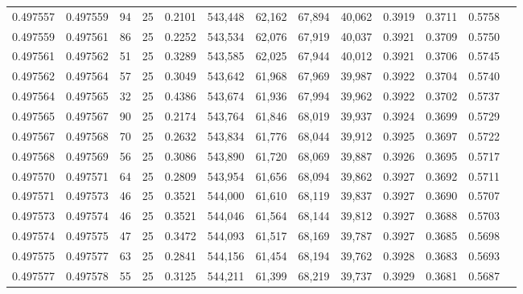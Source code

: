 \begin{tabular}{rrrrrrrrrrrrr}
0.497557 & 0.497559 &    94 &  25 &                                     0.2101 & 543,448 &  62,162 &  67,894 &  40,062 & 0.3919 & 0.3711 & 0.5758 \\
0.497559 & 0.497561 &    86 &  25 &                                     0.2252 & 543,534 &  62,076 &  67,919 &  40,037 & 0.3921 & 0.3709 & 0.5750 \\
0.497561 & 0.497562 &    51 &  25 &                                     0.3289 & 543,585 &  62,025 &  67,944 &  40,012 & 0.3921 & 0.3706 & 0.5745 \\
0.497562 & 0.497564 &    57 &  25 &                                     0.3049 & 543,642 &  61,968 &  67,969 &  39,987 & 0.3922 & 0.3704 & 0.5740 \\
0.497564 & 0.497565 &    32 &  25 &                                     0.4386 & 543,674 &  61,936 &  67,994 &  39,962 & 0.3922 & 0.3702 & 0.5737 \\
0.497565 & 0.497567 &    90 &  25 &                                     0.2174 & 543,764 &  61,846 &  68,019 &  39,937 & 0.3924 & 0.3699 & 0.5729 \\
0.497567 & 0.497568 &    70 &  25 &                                     0.2632 & 543,834 &  61,776 &  68,044 &  39,912 & 0.3925 & 0.3697 & 0.5722 \\
0.497568 & 0.497569 &    56 &  25 &                                     0.3086 & 543,890 &  61,720 &  68,069 &  39,887 & 0.3926 & 0.3695 & 0.5717 \\
0.497570 & 0.497571 &    64 &  25 &                                     0.2809 & 543,954 &  61,656 &  68,094 &  39,862 & 0.3927 & 0.3692 & 0.5711 \\
0.497571 & 0.497573 &    46 &  25 &                                     0.3521 & 544,000 &  61,610 &  68,119 &  39,837 & 0.3927 & 0.3690 & 0.5707 \\
0.497573 & 0.497574 &    46 &  25 &                                     0.3521 & 544,046 &  61,564 &  68,144 &  39,812 & 0.3927 & 0.3688 & 0.5703 \\
0.497574 & 0.497575 &    47 &  25 &                                     0.3472 & 544,093 &  61,517 &  68,169 &  39,787 & 0.3927 & 0.3685 & 0.5698 \\
0.497575 & 0.497577 &    63 &  25 &                                     0.2841 & 544,156 &  61,454 &  68,194 &  39,762 & 0.3928 & 0.3683 & 0.5693 \\
0.497577 & 0.497578 &    55 &  25 &                                     0.3125 & 544,211 &  61,399 &  68,219 &  39,737 & 0.3929 & 0.3681 & 0.5687 \\

\end{tabular}
